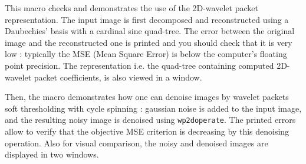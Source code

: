 This macro checks and demonstrates the use of the 2D-wavelet packet representation.
The input image is first decomposed and reconstructed using a Daubechies' 
basis with a cardinal sine quad-tree. The error between the original image
and the reconstructed one is printed and you should check that it is very low : 
typically the MSE (Mean Square Error) is below the computer's floating point precision.
The representation i.e. the quad-tree containing computed 2D-wavelet packet coefficients,
is also viewed in a window.

Then, the macro demonstrates how one can denoise images by wavelet packets soft 
thresholding with cycle spinning : gaussian noise is added to the input image,
and the resulting noisy image is denoised using \verb+wp2doperate+.
The printed errors allow to verify that the objective MSE criterion is
decreasing by this denoising operation. Also for visual comparison, 
the noisy and denoised images are displayed in two windows. 
